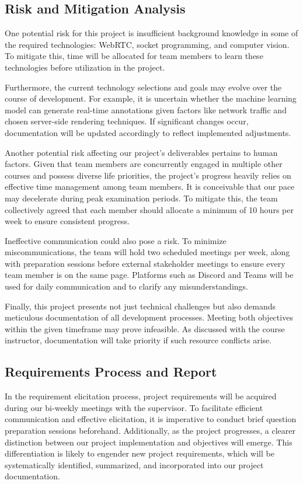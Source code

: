 \documentclass[12pt]{article}
\begin{document}
\subsection{Risk and Mitigation Analysis}
One potential risk for this project is insufficient background knowledge in some of the required technologies: WebRTC, socket programming, and computer vision. To mitigate this, time will be allocated for team members to learn these technologies before utilization in the project.

Furthermore, the current technology selections and goals may evolve over the course of development. For example, it is uncertain whether the machine learning model can generate real-time annotations given factors like network traffic and chosen server-side rendering techniques. If significant changes occur, documentation will be updated accordingly to reflect implemented adjustments.

Another potential risk affecting our project's deliverables pertains to human factors. Given that team members are concurrently engaged in multiple other courses and possess diverse life priorities, the project's progress heavily relies on effective time management among team members. It is conceivable that our pace may decelerate during peak examination periods. To mitigate this, the team collectively agreed that each member should allocate a minimum of 10 hours per week to ensure consistent progress.

Ineffective communication could also pose a risk. To minimize miscommunications, the team will hold two scheduled meetings per week, along with preparation sessions before external stakeholder meetings to ensure every team member is on the same page. Platforms such as Discord and Teams will be used for daily communication and to clarify any misunderstandings.

Finally, this project presents not just technical challenges but also demands meticulous documentation of all development processes. Meeting both objectives within the given timeframe may prove infeasible. As discussed with the course instructor, documentation will take priority if such resource conflicts arise.

\subsection{Requirements Process and Report}
In the requirement elicitation process, project requirements will be acquired during our bi-weekly meetings with the supervisor. To facilitate efficient communication and effective elicitation, it is imperative to conduct brief question preparation sessions beforehand. Additionally, as the project progresses, a clearer distinction between our project implementation and objectives will emerge. This differentiation is likely to engender new project requirements, which will be systematically identified, summarized, and incorporated into our project documentation.
\end{document}
